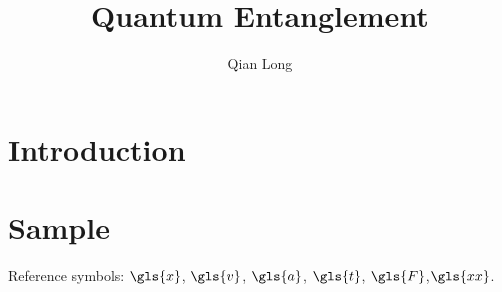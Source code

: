 \documentclass[a4paper,11pt,minitoc,gray,chapterstyletwo,twoside,loabychapter,lotbychapter,lofbychapter]{NusThesis}
\title{Quantum Entanglement}
\author{Qian Long}
\begin{document}
\frontmatter              %
\maketitle                %
\pagestyle{empty}
\AddDeclaration[signature2]%
\tableofcontents          %

\listoffigures            %
\listoftables             %
\listofsymbols            %
\listofalgorithms         %
\lstlistoflistings        %

\mainmatter              %
\chapter*{Introduction}
\pagestyle{circle}   %

\chapter{Sample}
Reference symbols: $\gls{x}$, $\gls{v}$, $\gls{a}$, $\gls{t}$,
$\gls{F}$,$\gls{xx}$.

\end{document}
